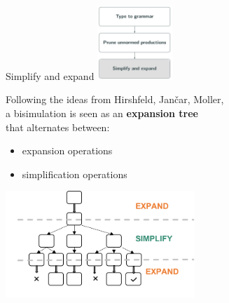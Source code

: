 \documentclass[10pt]{beamer}
\begin{document}


\begin{frame} {Simplify and expand}
	\hfill\includegraphics[height=2.8cm]{img/simplifyExpand.png}
	
	\vspace*{-3cm}
	Following the ideas from Hirshfeld, Jan{\v{c}}ar, Moller, \\
	a bisimulation is seen as an {\bf expansion tree}\\
    that alternates between:
	\begin{itemize}
		\item { expansion operations}
		\item { simplification operations	}
	\end{itemize}
	\begin{center}
		\hspace*{-2mm}\includegraphics[height=4cm]{img/expand_simplify}
	\end{center}	
\end{frame}
\end{document}
